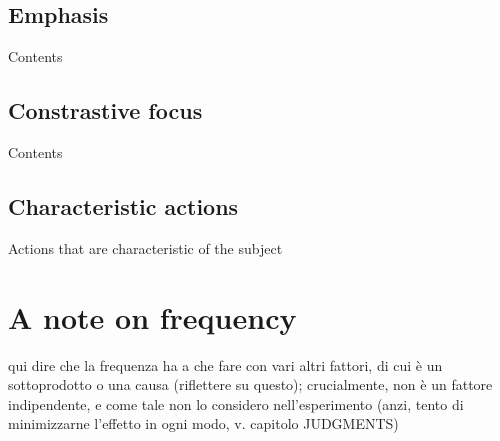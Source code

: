 \subsection{Emphasis} 

Contents

\subsection{Constrastive focus} 

Contents

\subsection{Characteristic actions} 

Actions that are characteristic of the subject


\section{A note on frequency}

qui dire che la frequenza ha a che fare con vari altri fattori, di cui è un sottoprodotto o una causa (riflettere su questo); crucialmente, non è un fattore indipendente, e come tale non lo considero nell'esperimento (anzi, tento di minimizzarne l'effetto in ogni modo, v. capitolo JUDGMENTS)






